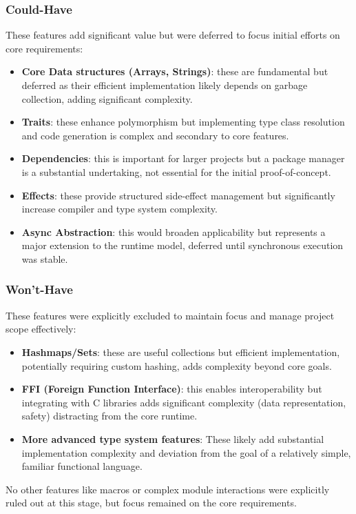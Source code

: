 \subsubsection*{Could-Have}
These features add significant value but were deferred to focus initial efforts on core requirements:
\begin{itemize}
    \item \textbf{Core Data structures (Arrays, Strings)}: these are fundamental but deferred as their efficient implementation likely depends on garbage collection, adding significant complexity.
    \item \textbf{Traits}: these enhance polymorphism but implementing type class resolution and code generation is complex and secondary to core features.
    \item \textbf{Dependencies}: this is important for larger projects but a package manager is a substantial undertaking, not essential for the initial proof-of-concept.
    \item \textbf{Effects}: these provide structured side-effect management but significantly increase compiler and type system complexity.
    \item \textbf{Async Abstraction}: this would broaden applicability but represents a major extension to the runtime model, deferred until synchronous execution was stable.
\end{itemize}

\subsubsection*{Won't-Have}
These features were explicitly excluded to maintain focus and manage project scope effectively:
\begin{itemize}
    \item \textbf{Hashmaps/Sets}: these are useful collections but efficient implementation, potentially requiring custom hashing, adds complexity beyond core goals.
    \item \textbf{FFI (Foreign Function Interface)}: this enables interoperability but integrating with C libraries adds significant complexity (data representation, safety) distracting from the core runtime.
    \item \textbf{More advanced type system features}: These likely add substantial implementation complexity and deviation from the goal of a relatively simple, familiar functional language.
\end{itemize}
No other features like macros or complex module interactions were explicitly ruled out at this stage, but focus remained on the core requirements.

